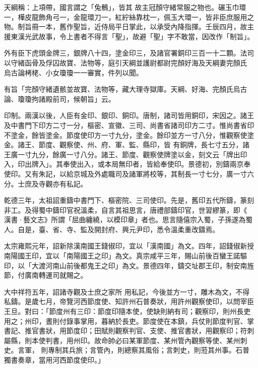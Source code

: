 \begin{pinyinscope}
 天綱稱：上項帶，國言謂之「兔鶻」，皆其
 故主冠顏守緒常服之物也。碾玉巾環一，樺皮龍飾角弓一，金龍環刀一，紅紵絲靠枕一，佩玉大環一，皆非臣庶服用之物。制旨冊一本，舊作聖旨，近侍局平日掌此，以承受內降指揮。壬辰四月，故主援東漢光武故事，令上書者不得言「聖」，故避「聖」字不敢當，因改作「制旨」。



 外有臣下虎頭金牌三，銀牌八十四，塗金印三，及諸官署銅印三百一十二顆。法司以守緒函骨及俘囚故寶、法物等，庭引天綱並護尉都尉完顏好海及天綱妻完顏氏
 烏古論栲栳、小女瓊瓊一一審實，件列以聞。



 有旨「完顏守緒遺骸並故寶、法物等，藏大理寺獄庫。天綱、好海、完顏氏烏古論、瓊瓊拘諸殿前司，候朝旨」云。



 印制。兩漢以後，人臣有金印、銀印、銅印。唐制，諸司皆用銅印，宋因之。諸王及中書門下印方二寸一分，樞密、宣徽、三司、尚書省諸司印方二寸。惟尚書省印不塗金，餘皆塗金。節度使印方一寸九分，塗金。餘印並方一寸八分，惟觀察使塗金。諸王、節度、觀察使、州、府、軍、監、縣印，皆
 有銅牌，長七寸五分，諸王廣一寸九分，餘廣一寸八分。諸王、節度、觀察使牌塗以金，刻文云「牌出印入，印出牌入」。其奉使出入，或本局無印者，皆給奉使印。景德初，別鑄兩京奉使印。又有朱記，以給京城及外處職司及諸軍將校等，其制長一寸七分，廣一寸六分。士庶及寺觀亦有私記。



 乾德三年，太祖詔重鑄中書門下、樞密院、三司使印。先是，舊印五代所鑄，篆刻非工。及得蜀中鑄印官祝溫柔，自言其祖思言，唐禮部鑄印官，世習繆篆，即《
 漢書·藝文志》所謂「屈曲纏繞，以模印章」者也。思言隨僖宗入蜀，子孫遂為蜀人。自是，臺、省、寺、監及開封府、興元尹印，悉令溫柔重改鑄焉。



 太宗雍熙元年，詔新除漢南國王錢俶印，宜以「漢南國」為文。四年，詔錢俶新授南陽國王印，宜以「南陽國王之印」為文。真宗咸平三年，賜山前後百蠻王諾驅印，以「大渡河南山前後都鬼王之印」為文。景德四年，鑄交址郡王印，制安南旌節，付廣南轉運司就賜之。



 大中祥符五年，詔諸寺觀及士庶之家所
 用私記，今後並方一寸，雕木為文，不得私鑄。是歲七月，帝覽河西節度使、知許州石普奏狀，用許州觀察使印，以問宰臣王旦。對曰：「節度州有三印：節度印隨本使，使缺則納有司；觀察印，則州長吏用之；州印，晝則付錄事掌用，暮納於長吏。節度使在本鎮，兵仗則節度判官、掌書記、推官書狀，用節度印；田賦則觀察判官、支使、推官書狀，用觀察印；符刺屬縣，則本使判書，用州印。故命帥必曰某軍節度、某州管內觀察等使、某州刺史。言軍，
 則專制其兵旅；言管內，則總察其風俗；言刺史，則蒞其州事。石普獨書奏章，當用河西節度使印。」




\end{pinyinscope}
